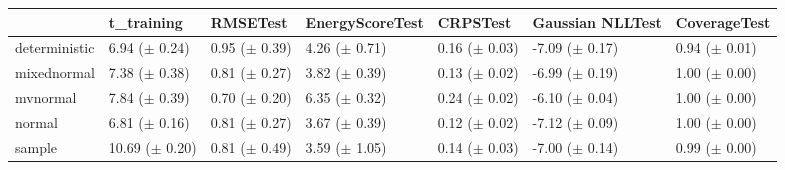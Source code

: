 \begin{tabular}{lllllll}
\toprule
 & t_training & RMSETest & EnergyScoreTest & CRPSTest & Gaussian NLLTest & CoverageTest \\
\midrule
deterministic & \makecell{6.94 \\ ($\pm$ 0.24)} & \makecell{0.95 \\ ($\pm$ 0.39)} & \makecell{4.26 \\ ($\pm$ 0.71)} & \makecell{0.16 \\ ($\pm$ 0.03)} & \makecell{-7.09 \\ ($\pm$ 0.17)} & \makecell{0.94 \\ ($\pm$ 0.01)} \\
mixednormal & \makecell{7.38 \\ ($\pm$ 0.38)} & \makecell{0.81 \\ ($\pm$ 0.27)} & \makecell{3.82 \\ ($\pm$ 0.39)} & \makecell{0.13 \\ ($\pm$ 0.02)} & \makecell{-6.99 \\ ($\pm$ 0.19)} & \makecell{1.00 \\ ($\pm$ 0.00)} \\
mvnormal & \makecell{7.84 \\ ($\pm$ 0.39)} & \makecell{0.70 \\ ($\pm$ 0.20)} & \makecell{6.35 \\ ($\pm$ 0.32)} & \makecell{0.24 \\ ($\pm$ 0.02)} & \makecell{-6.10 \\ ($\pm$ 0.04)} & \makecell{1.00 \\ ($\pm$ 0.00)} \\
normal & \makecell{6.81 \\ ($\pm$ 0.16)} & \makecell{0.81 \\ ($\pm$ 0.27)} & \makecell{3.67 \\ ($\pm$ 0.39)} & \makecell{0.12 \\ ($\pm$ 0.02)} & \makecell{-7.12 \\ ($\pm$ 0.09)} & \makecell{1.00 \\ ($\pm$ 0.00)} \\
sample & \makecell{10.69 \\ ($\pm$ 0.20)} & \makecell{0.81 \\ ($\pm$ 0.49)} & \makecell{3.59 \\ ($\pm$ 1.05)} & \makecell{0.14 \\ ($\pm$ 0.03)} & \makecell{-7.00 \\ ($\pm$ 0.14)} & \makecell{0.99 \\ ($\pm$ 0.00)} \\
\bottomrule
\end{tabular}
